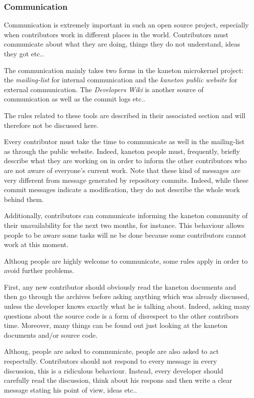 
\subsubsection{Communication}

Communication is extremely important in such an open source project, especially
when contributors work in different places in the world. Contributors must
communicate about what they are doing, things they do not understand, ideas
they got etc..

The communication mainly takes two forms in the kaneton microkernel project:
the \textit{mailing-list} for internal communication and the \textit{kaneton
public website} for external communication. The \textit{Developers Wiki}
is another source of communication as well as the commit logs etc..

The rules related to these tools are described in their associated section
and will therefore not be discussed here.

Every contributor must take the time to communicate as well in the mailing-list
as through the public website. Indeed, kaneton people must, frequently,
briefly describe what they are working on in order to inform the other
contributors who are not aware of everyone's current work. Note that these
kind of messages are very different from message generated by repository
commits. Indeed, while these commit messages indicate a modification, they
do not describe the whole work behind them.

Additionally, contributors can communicate informing the kaneton community of
their unavailability for the next two months, for instance. This behaviour
allows people to be aware some tasks will ne be done because some contributors
cannot work at this moment.

Althoug people are highly welcome to communicate, some rules apply in order
to avoid further problems.

First, any new contributor should obviously read the kaneton documents and
then go through the archives before asking anything which was already
discussed, unless the developer knows exactly what he is talking about.
Indeed, asking many questions about the source code is a form of disrespect
to the other contribors time. Moreover, many things can be found out just
looking at the kaneton documents and/or source code.

Althoug, people are asked to communicate, people are also asked to act
respectully. Contributors should not respond to every message in every
discussion, this is a ridiculous behaviour. Instead, every developer should
carefully read the discussion, think about his respons and then write a clear
message stating his point of view, ideas etc..

